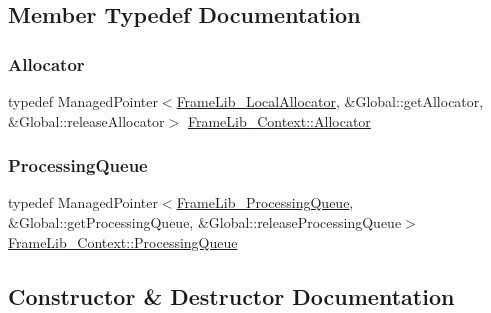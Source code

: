 \subsection{Member Typedef Documentation}
\mbox{\label{class_frame_lib___context_a4cfa321c8f6048211d031f05156b5b19}} 
\subsubsection{\texorpdfstring{Allocator}{Allocator}}
{\footnotesize\ttfamily typedef Managed\+Pointer$<$\hyperlink{class_frame_lib___local_allocator}{Frame\+Lib\+\_\+\+Local\+Allocator}, \&Global\+::get\+Allocator, \&Global\+::release\+Allocator$>$ \hyperlink{class_frame_lib___context_a4cfa321c8f6048211d031f05156b5b19}{Frame\+Lib\+\_\+\+Context\+::\+Allocator}}

\mbox{\label{class_frame_lib___context_af25ffc646e2a2062cd126357acd714df}} 
\subsubsection{\texorpdfstring{Processing\+Queue}{ProcessingQueue}}
{\footnotesize\ttfamily typedef Managed\+Pointer$<$\hyperlink{class_frame_lib___processing_queue}{Frame\+Lib\+\_\+\+Processing\+Queue}, \&Global\+::get\+Processing\+Queue, \&Global\+::release\+Processing\+Queue$>$ \hyperlink{class_frame_lib___context_af25ffc646e2a2062cd126357acd714df}{Frame\+Lib\+\_\+\+Context\+::\+Processing\+Queue}}



\subsection{Constructor \& Destructor Documentation}
\mbox{\label{class_frame_lib___context_a2cfe1912e3e9d835de291277c8979ed8}} 
